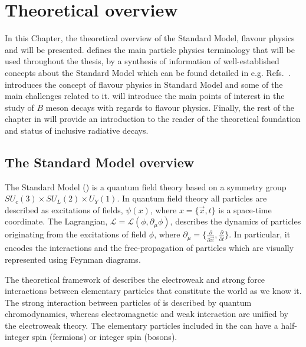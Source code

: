 \chapter{Theoretical overview}\label{ch:theory}

In this Chapter, the theoretical overview of the Standard Model, 
flavour physics and \BtoXsgamma will be presented.
 defines the main particle physics terminology that will be used throughout the thesis, by a synthesis of 
information of well-established concepts about the Standard Model which can be found detailed in e.g. Refs.~\cite{Peskin:1995ev,Thomson:2013zua,Griffiths:2008zz}.
 introduces the concept of flavour physics in Standard Model and some of the main challenges related to it.
 will introduce the main points of interest in the study of $B$ meson decays with regards to flavour physics.
Finally, the rest of the chapter in  will provide an introduction to the reader of the theoretical foundation and status of inclusive radiative decays.


\section{The Standard Model overview} \label{sec:standard_model}

The Standard Model (\SM) is a quantum field theory based on a symmetry group $SU_c(3)\times SU_L(2)\times U_Y(1)$.
In quantum field theory all particles are described as excitations of fields, $\psi(x)$, 
where $x=\{\vec{x},t\}$ is a space-time coordinate.
The Lagrangian, $\mathcal{L}=\mathcal{L}(\phi,\partial_{\mu}\phi)$, describes the dynamics of particles originating from the excitations of field $\phi$,
where $\partial_{\mu}=\{\frac{\partial}{\partial \vec{x}},\frac{\partial}{\partial t}\}$.
In particular, it encodes the interactions and the free-propagation of particles which are visually represented using Feynman diagrams.

The theoretical framework of \SM describes the electroweak and strong force interactions between elementary particles that constitute the world as we know it.
The strong interaction between particles of \SM is described by quantum chromodynamics, 
whereas electromagnetic and weak interaction are unified by the electroweak theory.
The elementary particles included in the \SM can have a half-integer spin (fermions) or integer spin (bosons).

